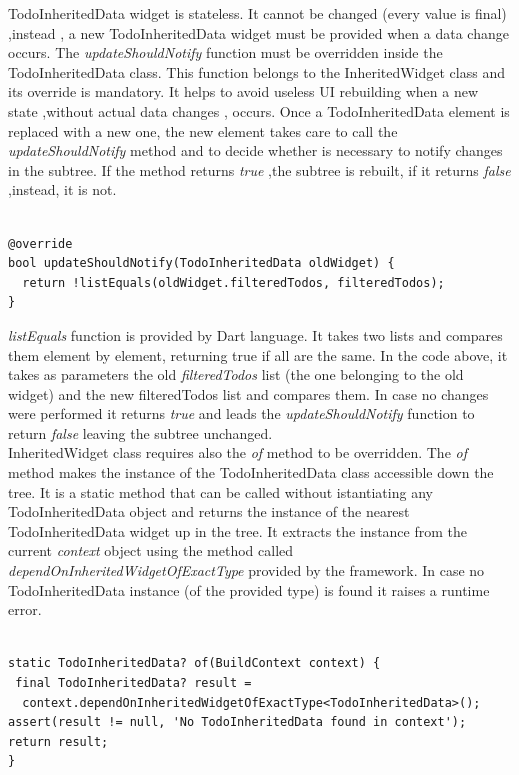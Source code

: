 TodoInheritedData widget is stateless. It cannot be changed (every value is final) ,instead , a new TodoInheritedData widget must be provided when a data change occurs. 
The \textit{updateShouldNotify }function must be overridden inside the TodoInheritedData class. This function belongs to the InheritedWidget class and its override is mandatory. It helps to avoid useless UI rebuilding when a new state ,without actual data changes , occurs. Once a TodoInheritedData element is replaced with a new one, the new element takes care to call the \textit{updateShouldNotify }method and to decide whether is necessary to notify changes in the subtree. If the method returns \textit{true },the subtree is rebuilt, if  it returns \textit{false} ,instead, it is not.
\mbox{}\\
\begin{code}
 \mbox{}

\label{code:2.16}
\begin{verbatim}

@override
bool updateShouldNotify(TodoInheritedData oldWidget) {
  return !listEquals(oldWidget.filteredTodos, filteredTodos);
}
\end{verbatim}
\end{code}
\mbox{}
\textit{listEquals }function is provided by Dart language. It takes two lists and compares them element by element, returning true if all are the same. In the code above, it takes as parameters the old \textit{filteredTodos} list (the one belonging to the old widget)  and the new filteredTodos list and compares them. In case no changes were performed it returns \textit{true} and leads the \textit{updateShouldNotify }function to return \textit{false} leaving the subtree unchanged.\\
InheritedWidget class requires also the \textit{of} method to be overridden. The \textit{of }method makes the instance of the TodoInheritedData class accessible down the tree. It is a static method that can be called without istantiating any TodoInheritedData object and returns the instance of the nearest TodoInheritedData widget up in the tree. It extracts the instance from the current \textit{context} object using the method called \textit{dependOnInheritedWidgetOfExactType} provided by the framework. In case no TodoInheritedData instance (of the provided type) is found it raises a runtime error.
\mbox{}
\begin{code}
 \mbox{}
\label{code:2.17}
\begin{verbatim}

static TodoInheritedData? of(BuildContext context) {
 final TodoInheritedData? result =
  context.dependOnInheritedWidgetOfExactType<TodoInheritedData>(); 
assert(result != null, 'No TodoInheritedData found in context');
return result;
}
\end{verbatim}
\end{code}
